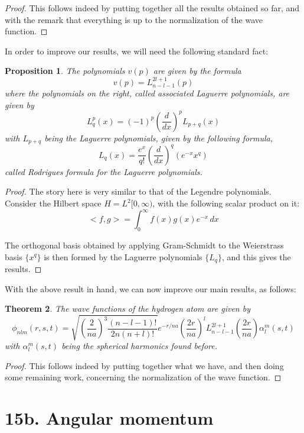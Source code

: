 \documentclass[12pt]{amsbook}
\newtheorem{theorem}{Theorem}[chapter]
\newtheorem{proposition}[theorem]{Proposition}
\begin{document}
\begin{proof}
This follows indeed by putting together all the results obtained so far, and with the remark that everything is up to the normalization of the wave function.
\end{proof}

In order to improve our results, we will need the following standard fact:

\begin{proposition}
The polynomials $v(p)$ are given by the formula
$$v(p)=L_{n-l-1}^{2l+1}(p)$$
where the polynomials on the right, called associated Laguerre polynomials, are given by
$$L_q^p(x)=(-1)^p\left(\frac{d}{dx}\right)^pL_{p+q}(x)$$
with $L_{p+q}$ being the Laguerre polynomials, given by the following formula,
$$L_q(x)=\frac{e^x}{q!}\left(\frac{d}{dx}\right)^q(e^{-x}x^q)$$
called Rodrigues formula for the Laguerre polynomials.
\end{proposition}

\begin{proof}
The story here is very similar to that of the Legendre polynomials. Consider the Hilbert space $H=L^2[0,\infty)$, with the following scalar product on it:
$$<f,g>=\int_0^\infty f(x)g(x)e^{-x}\,dx$$

The orthogonal basis obtained by applying Gram-Schmidt to the Weierstrass basis $\{x^q\}$ is then formed by the Laguerre polynomials $\{L_q\}$, and this gives the results.
\end{proof}

With the above result in hand, we can now improve our main results, as follows:

\begin{theorem}
The wave functions of the hydrogen atom are given by
$$\phi_{nlm}(r,s,t)=\sqrt{\left(\frac{2}{na}\right)^3\frac{(n-l-1)!}{2n(n+l)!}}e^{-r/na}\left(\frac{2r}{na}\right)^lL_{n-l-1}^{2l+1}\left(\frac{2r}{na}\right)\alpha_l^m(s,t)$$
with $\alpha_l^m(s,t)$ being the spherical harmonics found before.
\end{theorem}

\begin{proof}
This follows indeed by putting together what we have, and then doing some remaining work, concerning the normalization of the wave function.
\end{proof}

\section*{15b. Angular momentum}
\end{document}

